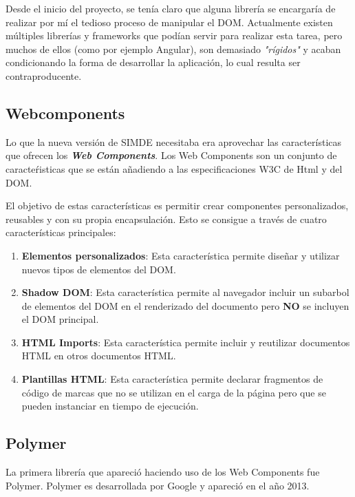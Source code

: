 Desde el inicio del proyecto, se tenía claro que alguna librería se encargaría de realizar 
por mí el tedioso proceso de manipular el DOM. Actualmente existen múltiples librerías 
y frameworks que podían servir para realizar esta tarea, pero muchos de ellos (como por ejemplo Angular),
son demasiado \textit{"rígidos"} y acaban condicionando la forma de desarrollar la aplicación, 
lo cual resulta ser contraproducente.

\subsection{Webcomponents}

\bigskip
Lo que la nueva versión de SIMDE necesitaba era aprovechar las características que ofrecen los
\textit\textbf{Web Components}. Los Web Components son un conjunto de caracteŕisticas que se 
están añadiendo a las especificaciones W3C de Html y del DOM.

\bigskip 
El objetivo de estas características es permitir crear componentes personalizados, reusables y 
con su propia encapsulación. Esto se consigue a través de cuatro características principales:

\begin{enumerate}

\item \textbf{Elementos personalizados}: Esta característica permite diseñar y utilizar nuevos tipos 
de elementos del DOM.
\item \textbf{Shadow DOM}: Esta característica permite al navegador incluir un subarbol de elementos del 
DOM en el renderizado del documento pero \textbf{NO} se incluyen el DOM principal.
\item \textbf{HTML Imports}: Esta característica permite incluir y reutilizar documentos HTML en otros 
documentos HTML.
\item \textbf{Plantillas HTML}: Esta característica permite declarar fragmentos de código de marcas que no
se utilizan en el carga de la página pero que se pueden instanciar en tiempo de ejecución. 

\end{enumerate}

\subsection{Polymer}
La primera librería que apareció haciendo uso de los Web Components fue Polymer. Polymer es desarrollada por
Google y apareció en el año 2013.

